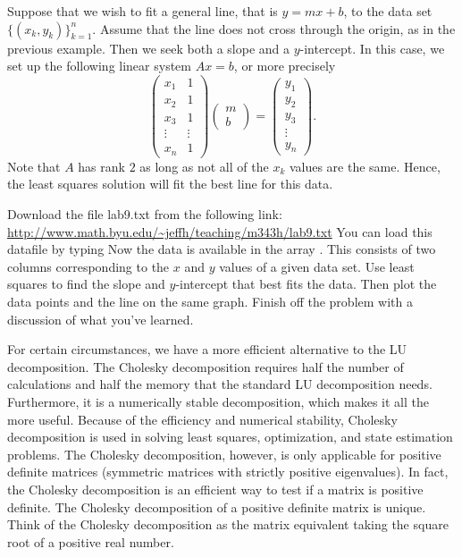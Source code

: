 Suppose that we wish to fit a general line, that is $y=m x+b$, to the data set $\{(x_k,y_k)\}^n_{k=1}$.  Assume that the line does not cross through the origin, as in the previous example.  Then we seek both a slope and a $y$-intercept.  In this case, we set up the following linear system $A x = b$, or more precisely
\[
\begin{pmatrix}
x_1 & 1\\
x_2 & 1\\
x_3 & 1\\
\vdots & \vdots\\
x_n & 1
\end{pmatrix}
\begin{pmatrix}
m\\
b
\end{pmatrix}=
\begin{pmatrix}
y_1\\
y_2\\
y_3\\
\vdots\\
y_n
\end{pmatrix}.
\]
Note that $A$ has rank $2$ as long as not all of the $x_k$ values are the same.  Hence, the least squares solution will fit the best line for this data.


\begin{problem}
Download the file lab9.txt from the following link:
\url{http://www.math.byu.edu/~jeffh/teaching/m343h/lab9.txt}
You can load this datafile by typing
Now the data is available in the array .
This consists of two columns corresponding to the $x$ and $y$ values of a given data set.  Use least squares to find the slope and $y$-intercept that best fits the data.  Then plot the data points and the line on the same graph.  Finish off the problem with a discussion of what you've learned.
\end{problem}


For certain circumstances, we have a more efficient alternative to the LU decomposition.  The Cholesky decomposition requires half the number of calculations and half the memory that the standard LU decomposition needs.  Furthermore, it is a numerically stable decomposition, which makes it all the more useful.  Because of the efficiency and numerical stability, Cholesky decomposition is used in solving least squares, optimization, and state estimation problems.  The Cholesky decomposition, however, is only applicable for positive definite matrices (symmetric matrices with strictly positive eigenvalues).  In fact, the Cholesky decomposition is an efficient way to test if a matrix is positive definite.  The Cholesky decomposition of a positive definite matrix is unique.  Think of the Cholesky decomposition as the matrix equivalent taking the square root of a positive real number.

